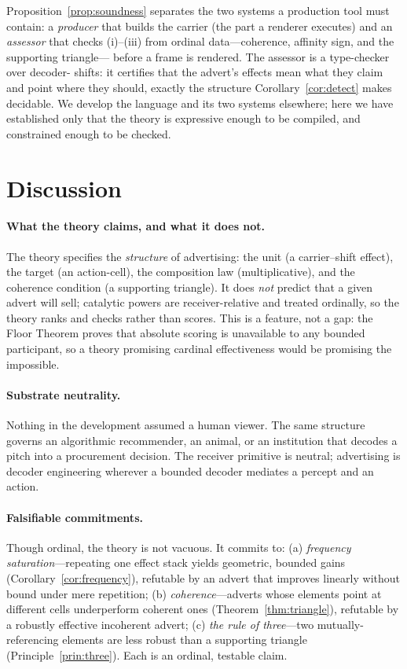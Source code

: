 \documentclass[twocolumn,11pt,a4paper]{article}
\theoremstyle{adv}
\theoremstyle{definition}
\theoremstyle{remark}
\begin{document}
Proposition~\ref{prop:soundness} separates the two systems a production
tool must contain: a \emph{producer} that builds the carrier (the part a
renderer executes) and an \emph{assessor} that checks (i)--(iii) from
ordinal data---coherence, affinity sign, and the supporting triangle---
before a frame is rendered. The assessor is a type-checker over decoder-
shifts: it certifies that the advert's effects mean what they claim and
point where they should, exactly the structure
Corollary~\ref{cor:detect} makes decidable. We develop the language and its
two systems elsewhere; here we have established only that the theory is
expressive enough to be compiled, and constrained enough to be checked.

\section{Discussion}
\label{sec:discussion}

\paragraph{What the theory claims, and what it does not.}
The theory specifies the \emph{structure} of advertising: the unit (a
carrier--shift effect), the target (an action-cell), the composition law
(multiplicative), and the coherence condition (a supporting triangle). It
does \emph{not} predict that a given advert will sell; catalytic powers are
receiver-relative and treated ordinally, so the theory ranks and checks
rather than scores. This is a feature, not a gap: the Floor Theorem proves
that absolute scoring is unavailable to any bounded participant, so a
theory promising cardinal effectiveness would be promising the impossible.

\paragraph{Substrate neutrality.}
Nothing in the development assumed a human viewer. The same structure
governs an algorithmic recommender, an animal, or an institution that
decodes a pitch into a procurement decision. The receiver primitive is
neutral; advertising is decoder engineering wherever a bounded decoder
mediates a percept and an action.

\paragraph{Falsifiable commitments.}
Though ordinal, the theory is not vacuous. It commits to:
(a) \emph{frequency saturation}---repeating one effect stack yields
geometric, bounded gains (Corollary~\ref{cor:frequency}), refutable by an
advert that improves linearly without bound under mere repetition;
(b) \emph{coherence}---adverts whose elements point at different cells
underperform coherent ones (Theorem~\ref{thm:triangle}), refutable by a
robustly effective incoherent advert; (c) \emph{the rule of three}---two
mutually-referencing elements are less robust than a supporting triangle
(Principle~\ref{prin:three}). Each is an ordinal, testable claim.
\end{document}

